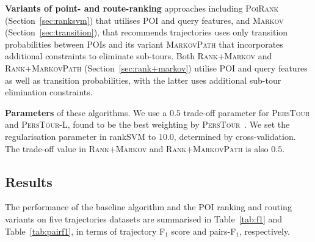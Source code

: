 {\bf Variants of point- and route-ranking} approaches including \textsc{PoiRank} (Section~\ref{sec:ranksvm})
that utilises POI and query features,
and \textsc{Markov} (Section~\ref{sec:transition}),
that recommends trajectories uses only transition probabilities between POIs
and its variant \textsc{MarkovPath} that incorporates additional constraints to eliminate sub-tours.
Both \textsc{Rank+Markov} and \textsc{Rank+MarkovPath} (Section~\ref{sec:rank+markov})
utilise POI and query features as well as transition probabilities, with the latter uses
additional sub-tour elimination constraints.

{\bf Parameters} of these algorithms.
We use a $0.5$ trade-off parameter for \textsc{PersTour} and \textsc{PersTour-L},
found to be the best weighting by \textsc{PersTour}~\cite{ijcai15}.
We set the regularisation parameter in rankSVM to  $10.0$, determined by cross-validation.
The trade-off value in \textsc{Rank+Markov} and \textsc{Rank+MarkovPath} is also $0.5$.


\subsection{Results}
\label{sec:result}
\secmoveup

The performance of the baseline algorithm and the POI ranking and routing variants
on five trajectories datasets are summarised in Table~\ref{tab:f1}
and Table~\ref{tab:pairf1}, in terms of trajectory F$_1$ score and pairs-F$_1$, respectively.


